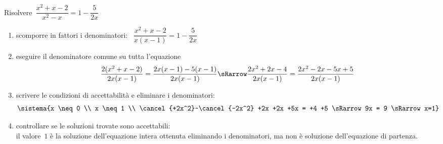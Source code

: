  \begin{esempio}{}{}
Risolvere~\(\dfrac{x^{2}+x-2}{x^{2}-x}=1-\dfrac{5}{2x}\)

\begin{enumerate}[nosep]
\item scomporre in fattori i denominatori:~
\(\dfrac{x^{2}+x-2}{x(x-1)}=1-\dfrac{5}{2x}\)

\item eseguire il denominatore comune su tutta l'equazione
\[\frac{2(x^{2}+x-2)}{2x(x-1)}=\frac{2x(x-1)-5(x-1)}{2x(x-1)} \sRarrow
\frac{2x^{2}+2x-4}{2x(x-1)}=\frac{2x^2-2x-5x+5}{2x(x-1)}\]

\item scrivere le condizioni di accettabilità e eliminare i denominatori:
\[\sistema{x \neq 0 \\ 
           x \neq 1 \\ 
           \cancel{+2x^2}~\cancel{-2x^2} +2x +2x +5x = +4 +5 \sRarrow
             9x = 9 \sRarrow x=1}\]


\item controllare se le soluzioni trovate sono accettabili:\\
il valore~\(1\) è la soluzione dell'equazione intera ottenuta eliminando i 
denominatori, ma non è soluzione dell'equazione di partenza.
\end{enumerate}
 \end{esempio}
 
